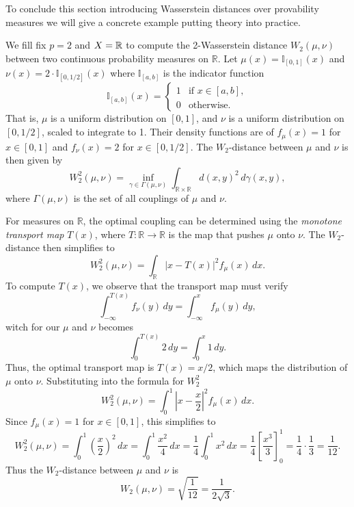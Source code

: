 To conclude this section introducing Wasserstein distances over provability measures we will give a concrete example putting theory into practice.

\begin{example}
    We fill fix $ p = 2 $ and $ X = \mathbb R $ to compute the 2-Wasserstein distance $W_2(\mu, \nu)$ between two continuous probability measures on $\mathbb{R}$. Let $\mu(x) = \mathbb{I}_{[0,1]}(x)$ and $\nu(x) = 2 \cdot \mathbb{I}_{[0,1/2]}(x)$
    where $\mathbb{I}_{[a,b]}$ is the indicator function
    $$
    \mathbb{I}_{[a,b]}(x) = 
    \begin{cases}
    1 & \text{if } x \in [a,b], \\
    0 & \text{otherwise.}
    \end{cases}
    $$
    That is, $\mu$ is a uniform distribution on $[0,1]$, and $\nu$ is a uniform distribution on $[0,1/2]$, scaled to integrate to 1. Their density functions are of $ f_\mu(x) = 1 $ for $x \in [0,1] $ and $ f_\nu(x) = 2 $ for $x \in [0,1/2] $. The $W_2$-distance between $\mu$ and $\nu$ is then given by
    $$
    W_2^2(\mu, \nu) = \inf_{\gamma \in \Gamma(\mu, \nu)} \int_{\mathbb{R} \times \mathbb{R}} d(x, y)^2 \, d\gamma(x, y),
    $$
    where $\Gamma(\mu, \nu)$ is the set of all couplings of $\mu$ and $\nu$.
    
    For measures on $\mathbb{R}$, the optimal coupling can be determined using the \emph{monotone transport map} $T(x)$, where $T: \mathbb{R} \to \mathbb{R}$ is the map that pushes $\mu$ onto $\nu$. The $W_2$-distance then simplifies to
    $$
    W_2^2(\mu, \nu) = \int_\mathbb{R} |x - T(x)|^2 f_\mu(x) \, dx.
    $$
    To compute $T(x)$, we observe that the transport map must verify
    $$
    \int_{-\infty}^{T(x)} f_\nu(y) \, dy = \int_{-\infty}^x f_\mu(y) \, dy,
    $$
    witch for our $\mu$ and $\nu$ becomes
    $$
    \int_{0}^{T(x)} 2 \, dy = \int_{0}^x 1 \, dy.
    $$
    Thus, the optimal transport map is $T(x) = x/2$, which maps the distribution of $\mu$ onto $\nu$. Substituting into the formula for $W_2^2$
    $$
    W_2^2(\mu, \nu) = \int_0^1 \left|x - \frac{x}{2}\right|^2 f_\mu(x) \, dx.
    $$
    Since $f_\mu(x) = 1$ for $x \in [0,1]$, this simplifies to
    $$
    W_2^2(\mu, \nu) = \int_0^1 \left(\frac{x}{2}\right)^2 \, dx = \int_0^1 \frac{x^2}{4} \, dx = \frac{1}{4}\int_0^1 x^2 \, dx = \frac{1}{4}\left[\frac{x^3}{3}\right]_0^1 = \frac{1}{4} \cdot \frac{1}{3} = \frac{1}{12}.
    $$
    Thus the $W_2$-distance between $\mu $ and $ \nu$ is
    $$
    W_2(\mu, \nu) = \sqrt{\frac{1}{12}} = \frac{1}{2\sqrt{3}}.
    $$
\end{example}